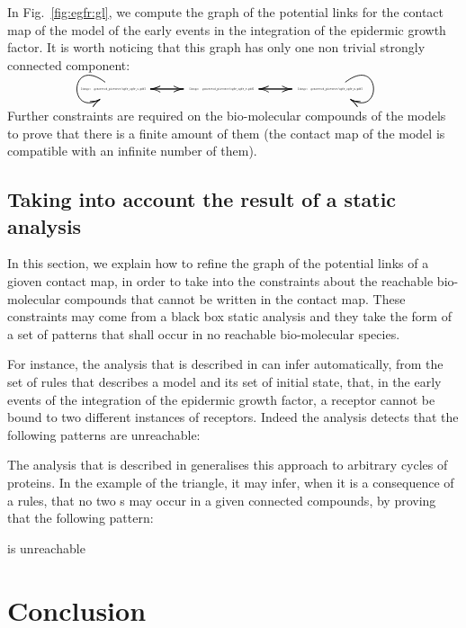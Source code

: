 \documentclass{entcs}
\begin{document}
\begin{exmp}
In Fig.~\ref{fig:egfr:gl}, we compute the graph of the potential links for the contact map of the model of the early events in the integration of the epidermic growth factor. It is worth noticing that this graph has only one non trivial strongly connected component:
\begin{equation*}\hspace*{1cm}\scalebox{1.5}{\xymatrix@C=0.2cm@R=0.35cm{\begin{minipage}{1.2cm}\scalebox{0.15}{\texttt{[image: generated\_pictures/egfr\_egfr\_c.pdf]}}\end{minipage}
  \ar@{->}[rr]
  \ar@{->}@(ul,dl)
  &&
\begin{minipage}{1.2cm}\scalebox{0.15}{\texttt{[image: generated\_pictures/egfr\_egfr\_r.pdf]}}\end{minipage}
  \ar@{->}[ll]
  \ar@{->}[rr]&&
\begin{minipage}{1.5cm}\scalebox{0.15}{\texttt{[image: generated\_pictures/egfr\_egfr\_n.pdf]}}\end{minipage}
  \ar@{->}[ll]
  \ar@{->}@(ur,dr)&&}}\end{equation*}
Further constraints are required on the bio-molecular compounds of the models to prove that there is a finite amount of them (the contact map of the model is compatible with an infinite number of them).
\end{exmp}

\subsection{Taking into account the result of a static analysis}

In this section, we explain how to refine the graph of the potential links of a gioven contact map, in order to take into the constraints about the reachable bio-molecular compounds that cannot be written in the contact map.
These constraints may come from a black box static analysis \cite{SASB2016,KaSa} and they take the form of a set of patterns that shall occur in no reachable bio-molecular species.

For instance, the analysis that is described in \cite{SASB2016} can infer automatically, from the set of rules that describes a model and its set of initial state, that, in the early events of the integration of the epidermic growth factor, a receptor cannot be bound to two different instances of receptors. Indeed the analysis detects that the following patterns are unreachable:

The analysis that is described in \cite{afp} generalises this approach to arbitrary cycles of proteins. In the example of the triangle, it may infer, when it is a consequence of a rules, that no two s may occur in a given connected compounds, by proving that the following pattern: 

is unreachable


\label{sec:refinement}
\section{Conclusion}



\end{document}
